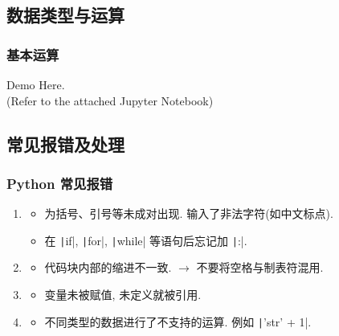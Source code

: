 \documentclass{ctexbeamer}
\begin{document}
    \subsection{数据类型与运算}
    \begin{frame}[fragile]
        \frametitle{基本运算}
        \begin{center}
            \Large Demo Here. \\
            (Refer to the attached Jupyter Notebook)
        \end{center}
    \end{frame}

    \subsection{常见报错及处理}
    \begin{frame}
        \frametitle{Python 常见报错}
        \begin{enumerate}
            \item<1-> 
            \begin{itemize}
                \item 为括号、引号等未成对出现. 输入了非法字符(如中文标点).
                \item 在 \texttt|if|, \texttt|for|, \texttt|while| 等语句后忘记加 \texttt|:|.
            \end{itemize}
            \item<2-> 
            \begin{itemize}
                \item 代码块内部的缩进不一致. $\to$ 不要将空格与制表符混用.
            \end{itemize} 
            \item<3-> 
            \begin{itemize}
                \item 变量未被赋值, 未定义就被引用.
            \end{itemize} 
            \item<4-> 
            \begin{itemize}
                \item 不同类型的数据进行了不支持的运算. 例如 \texttt|'str' + 1|.

\end{itemize}
\end{enumerate}
\end{frame}
\end{document}
